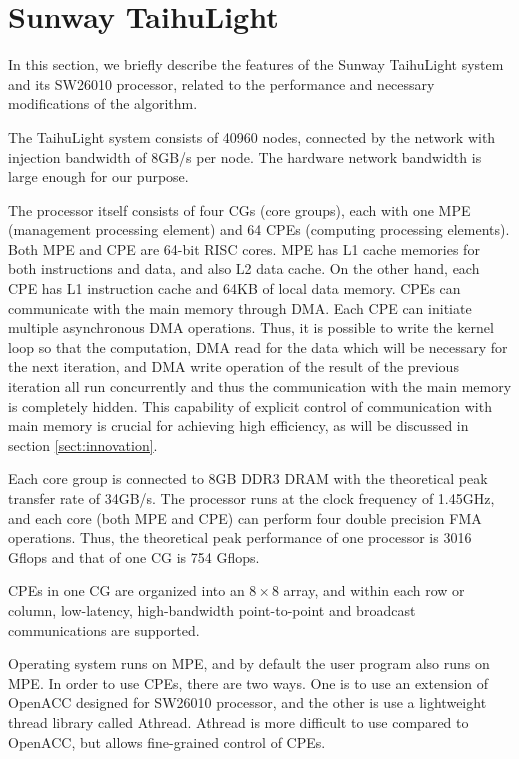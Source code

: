 \documentclass[sigconf]{acmart}
\begin{document}
\section{Sunway TaihuLight}

In this section, we briefly describe the features of the Sunway
TaihuLight system and its SW26010 processor, related to the
performance and necessary modifications of the algorithm.

The TaihuLight system consists of 40960 nodes, connected by the
network with injection bandwidth of 8GB/s per node. The hardware network
bandwidth is large enough for our purpose.

The processor itself consists of four CGs (core groups), each with one
MPE (management processing element) and 64 CPEs (computing processing
elements). Both MPE and CPE are 64-bit RISC cores. MPE has L1 cache
memories for  both instructions and data, and also L2 data cache. On
the other hand, each CPE has L1 instruction cache and 64KB of local
data memory. CPEs can communicate with the main memory through DMA.
Each CPE can initiate multiple asynchronous DMA operations. Thus, it is
possible to write the kernel loop so that the computation, DMA read
for the data which will be necessary for the next iteration, and DMA
write operation of the result of the previous iteration all run
concurrently and thus the communication with the main memory is
completely hidden. This capability of explicit control of
communication with main memory is crucial for achieving high
efficiency, as will be discussed in section \ref{sect:innovation}.


Each core group is connected to 8GB DDR3 DRAM with the theoretical
peak transfer rate of 34GB/s. The processor runs at the clock
frequency of 1.45GHz, and each core (both MPE and CPE) can perform
four double precision FMA operations. Thus, the theoretical peak
performance of one processor is 3016 Gflops and that of one CG is 754
Gflops.

CPEs in one CG are organized into an $8\times 8$ array, and within
each row or column, low-latency, high-bandwidth point-to-point and
broadcast communications are supported.

Operating system runs on MPE, and by default the user program also
runs on MPE. In order to use CPEs, there are two ways. One is to use an
extension of OpenACC designed for SW26010 processor, and the other is
use a lightweight thread library called Athread. Athread is more
difficult to use compared to OpenACC, but allows fine-grained control
of CPEs. 
\end{document}
